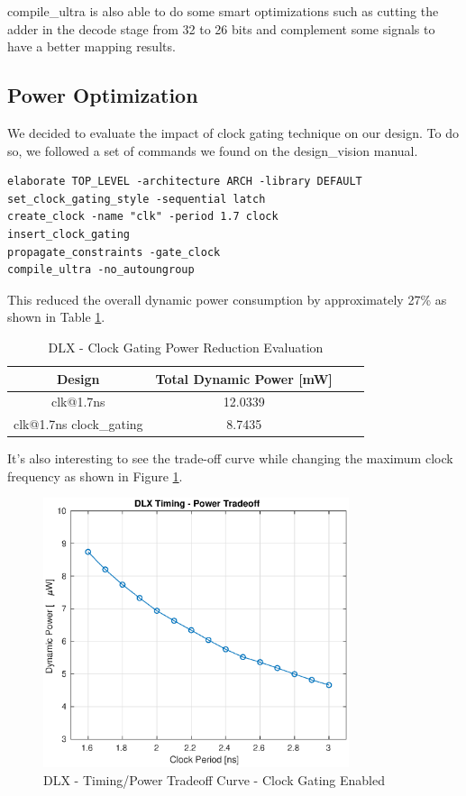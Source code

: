 \documentclass[12pt]{article}
\begin{document}
compile\_ultra is also able to do some smart optimizations such as cutting the adder in the decode stage from 32 to 26 bits and complement some signals to have a better mapping results.

\subsection{Power Optimization}
We decided to evaluate the impact of clock gating technique on our design. To do so, we followed a set of commands we found on the design\_vision manual.
\begin{minipage}{\linewidth}
\begin{lstlisting}
elaborate TOP_LEVEL -architecture ARCH -library DEFAULT
set_clock_gating_style -sequential latch
create_clock -name "clk" -period 1.7 clock
insert_clock_gating
propagate_constraints -gate_clock
compile_ultra -no_autoungroup
\end{lstlisting}
\end{minipage}


This reduced the overall dynamic power consumption by approximately 27\% as shown in Table \ref{POWERTABLE}.

	
\begin{table}[h]
	\begin{center}
	\begin{tabular}{ | c | c | c | c |}
		\hline
		\rowcolor{LimeGreen}Design &Total Dynamic Power [mW]\\ \hline
		clk@1.7ns & 12.0339 \\ \hline
		clk@1.7ns clock\_gating & 8.7435 \\ \hline
	\end{tabular}
		\caption{DLX - Clock Gating Power Reduction Evaluation}
		\label{POWERTABLE}
	\end{center}
\end{table}


It's also interesting to see the trade-off curve while changing the maximum clock frequency as shown in Figure \ref{PPA}.
\begin{figure}[!ht]
	\includegraphics[width=0.8\textwidth, center]{images/PPA.eps}
	\caption{DLX - Timing/Power Tradeoff Curve - Clock Gating Enabled}
	\label{PPA}
\end{figure}
\end{document}
